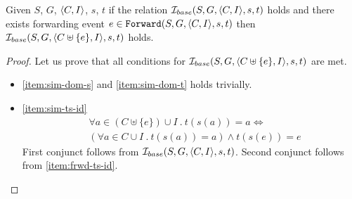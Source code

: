 \documentclass[12pt]{article}
\begin{document}

\begin{lemma}
  \label{lemma:sim-forward}
  Given $S$, $G$, $\langle C, I \rangle$, $s$, $t$
  if the relation $\mathcal{I}_{base}(S, G, \langle C, I \rangle, s, t)$ holds and 
  there exists forwarding event $e \in {\mathtt{Forward}}(S, G, \langle C, I \rangle, s, t)$
  then $\mathcal{I}_{base}(S, G, \langle C \uplus \{e\}, I \rangle, s, t)$ holds. 
\end{lemma}

\begin{proof}
  
  Let us prove that all conditions for $\mathcal{I}_{base}(S, G, \langle C \uplus \{e\}, I \rangle, s, t)$ are met.
  \begin{itemize}

  \item \ref{item:sim-dom-s} and \ref{item:sim-dom-t} holds trivially.

  \item \ref{item:sim-ts-id} \\
    \begin{equation*}
      \begin{split}
        & \forall{a \in (C \uplus \{e\}) \cup I} ~.~ t(s(a)) = a \iff \\
        & (\forall{a \in C \cup I} ~.~ t(s(a)) = a) \wedge t(s(e)) = e
      \end{split}
    \end{equation*}
    First conjunct follows from $\mathcal{I}_{base}(S, G, \langle C, I \rangle, s, t)$.
    Second conjunct follows from \ref{item:frwd-ts-id}.



\end{itemize}
\end{proof}
\end{document}
